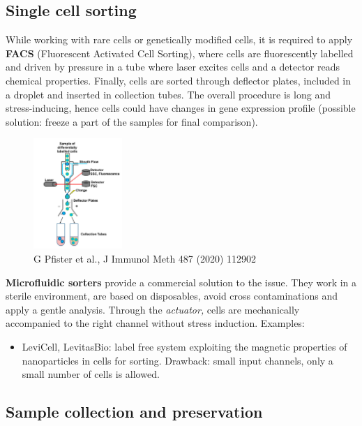 \hypertarget{single-cell-sorting}{%
\subsection{Single cell sorting}\label{single-cell-sorting}}

While working with rare cells or genetically modified cells, it is
required to apply \textbf{FACS} (Fluorescent Activated Cell Sorting),
where cells are fluorescently labelled and driven by pressure in a tube
where laser excites cells and a detector reads chemical properties.
Finally, cells are sorted through deflector plates, included in a
droplet and inserted in collection tubes. The overall procedure is long
and stress-inducing, hence cells could have changes in gene expression
profile (possible solution: freeze a part of the samples for final
comparison).

\begin{figure}
\centering
\includegraphics[width=0.3\textwidth]{images/Screenshot_2.png}
\caption{G Pfister et al., J Immunol Meth 487 (2020) 112902 }
\end{figure}


\textbf{Microfluidic sorters} provide a commercial solution to the
issue. They work in a sterile environment, are based on disposables,
avoid cross contaminations and apply a gentle analysis. Through the
\emph{actuator,} cells are mechanically accompanied to the right channel
without stress induction. Examples:

\begin{itemize}
\tightlist
\item
  LeviCell, LevitasBio: label free system exploiting the magnetic
  properties of nanoparticles in cells for sorting. Drawback: small
  input channels, only a small number of cells is allowed.
\end{itemize}

\hypertarget{sample-collection-and-preservation}{%
\subsection{Sample collection and
preservation}\label{sample-collection-and-preservation}}

